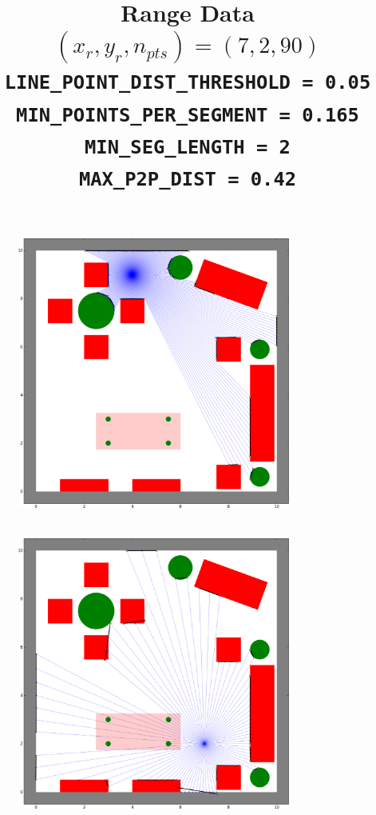 \documentclass[12pt]{article}
\begin{document}
\begin{enumerate}
\begin{figure}[H]
		\includegraphics[width=0.8\textwidth]{../Figures/hw2_2_ii_49360.png}
	\end{figure}
	\begin{figure}[H]
		\centering
		\title{\bf Range Data $(x_r, y_r, n_{pts}) = (7,2,90)$ \\ \vspace{2.5mm}
			\verb|LINE_POINT_DIST_THRESHOLD = 0.05| \\
			\verb|MIN_POINTS_PER_SEGMENT = 0.165| \\
			\verb|MIN_SEG_LENGTH = 2| \\
			\verb|MAX_P2P_DIST = 0.42|}
		\\ \vspace{5mm}
		\includegraphics[width=0.8\textwidth]{../Figures/hw2_2_ii_7290.png}
	\end{figure}
\end{enumerate}
\end{document}
